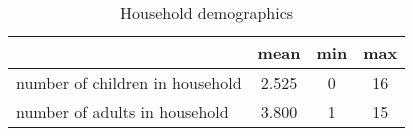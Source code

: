 \begin{table}[htbp]\centering
\def\sym#1{\ifmmode^{#1}\else\(^{#1}\)\fi}
\caption{Household demographics \label{tab:"label"}}
\begin{tabular*}{0.9\hsize}{@{\hskip\tabcolsep\extracolsep\fill}l*{1}{ccc}}
\toprule
                                &     mean&      min&      max\\
\midrule
number of children in household &    2.525&        0&       16\\
number of adults in household   &    3.800&        1&       15\\
\bottomrule
\end{tabular*}
\end{table}
